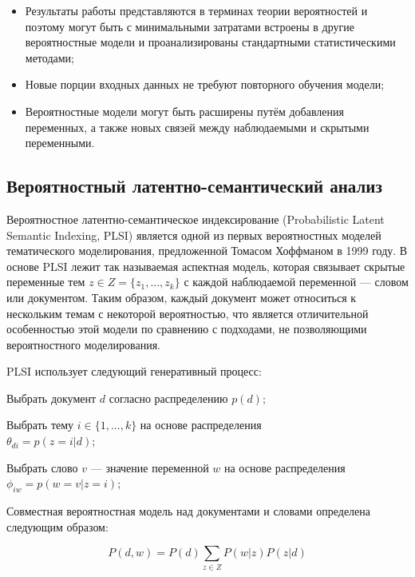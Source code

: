 \begin{itemize}
\item Результаты работы представляются в терминах теории вероятностей и поэтому могут быть с минимальными затратами встроены в другие вероятностные модели и проанализированы стандартными статистическими методами; 
\item Новые порции входных данных не требуют повторного обучения модели; 
\item Вероятностные модели могут быть расширены путём добавления переменных, а также новых связей между наблюдаемыми и скрытыми переменными.
\end{itemize}

\subsection{Вероятностный латентно-семантический анализ}


Вероятностное латентно-семантическое индексирование (Probabilistic Latent Semantic Indexing, PLSI) является одной из первых вероятностных моделей тематического моделирования, предложенной Томасом Хоффманом в 1999 году. 
В основе PLSI лежит так называемая аспектная модель, которая связывает скрытые переменные тем $z\in Z=\{z_1,...,z_k\}$ с каждой наблюдаемой переменной — словом или документом. Таким образом, каждый документ может относиться к нескольким темам с некоторой вероятностью, что является отличительной особенностью этой модели по сравнению с подходами, не позволяющими вероятностного моделирования. 

PLSI использует следующий генеративный процесс: 

\begin{enumerate*}
\item Выбрать документ $d$ согласно распределению $p(d)$;
\item Выбрать тему $i\in \{1,...,k\}$ на основе распределения \\ \mbox{$\theta_{di}=p(z=i|d)$};
\item Выбрать слово $v$ — значение переменной $w$ на основе распределения $\phi_{iw}=p(w=v|z=i)$;
\end{enumerate*}

Совместная вероятностная модель над документами и словами определена следующим образом:

\begin{equation}\label{}
P(d,w)=P(d)\sum_{z\in Z}P(w|z)P(z|d)
\end{equation}

